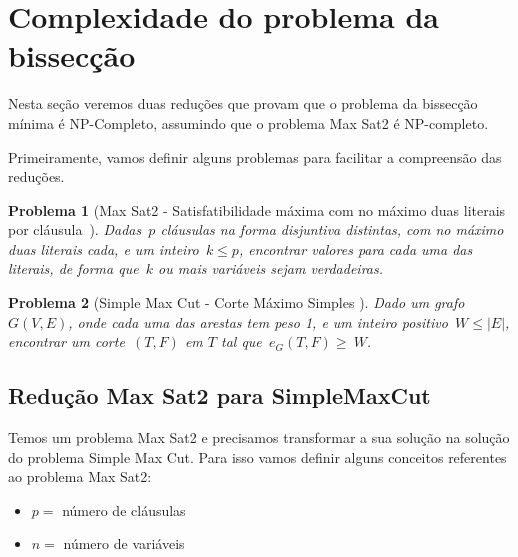 \documentclass[a4paper,12pt]{article}
\newtheorem{prob}{Problema}
\begin{document}
\newpage
\section {Complexidade do problema da bissecção}
	Nesta seção veremos duas reduções que provam que o problema 
	da bissecção mínima é NP-Completo, assumindo
	que o problema Max Sat2 é NP-completo.

	Primeiramente, vamos definir alguns problemas para facilitar
	a compreensão das reduções.

	\medskip

	\begin{prob}[Max Sat2 - Satisfatibilidade máxima com no máximo 
	duas literais por cláusula{~\cite{GareyJS76}}]
		Dadas~$p$ cláusulas na forma disjuntiva distintas, com no máximo
		duas literais cada, e um inteiro~$k\le p$,
		encontrar valores para cada uma das literais, de forma
		que~$k$ ou mais variáveis sejam verdadeiras.

	\end{prob}

	\medskip

	\begin{prob}[Simple Max Cut - Corte Máximo Simples 
]
		Dado um grafo~$G(V,E)$, onde cada uma das arestas tem 
		peso 1, e um inteiro positivo~$W\le|E|$, encontrar um
		corte~$(T,F)$ em $T$ tal 
		que~$e_G(T,F)\ge~W$.
		
	\end{prob}

	

		

	\bigskip
	\bigskip
	\bigskip

	\subsection{Redução Max Sat2 para SimpleMaxCut}

		Temos um problema Max Sat2 e precisamos transformar
		a sua solução na solução do problema Simple Max Cut.
		Para isso vamos definir alguns conceitos referentes
		ao problema Max Sat2:
		\begin{itemize}
			\item $p = $ número de cláusulas
			\item $n = $ número de variáveis
		\end{itemize}
\end{document}

